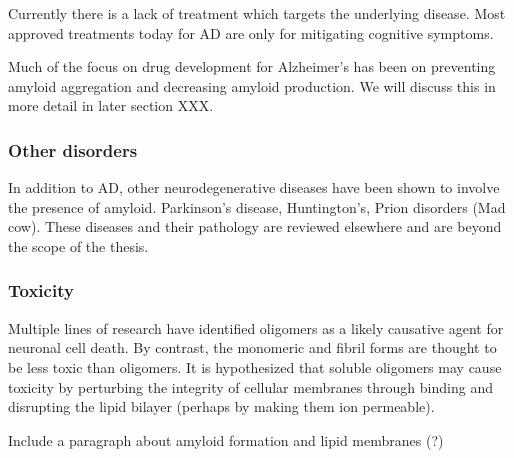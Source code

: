 Currently there is a lack of treatment which targets the underlying disease. Most approved treatments today for AD are only for mitigating cognitive symptoms. 

Much of the focus on drug development for Alzheimer's has been on preventing amyloid aggregation and decreasing amyloid production.
We will discuss this in more detail in later section XXX.

\subsubsection{Other disorders}
In addition to AD, other neurodegenerative diseases have been shown to involve the presence of amyloid.  Parkinson's disease, Huntington's, Prion disorders (Mad cow).  These diseases and their pathology are reviewed elsewhere and are beyond the scope of the thesis.


\subsubsection{Toxicity}
\begin{outline}
	\1 Multiple lines of research have identified oligomers as a likely causative agent for neuronal cell death. By contrast, the monomeric and fibril forms are thought to be less toxic than oligomers. It is hypothesized that soluble oligomers may cause toxicity by perturbing the integrity of cellular membranes through binding and disrupting the lipid bilayer (perhaps by making them ion permeable). \cite{Walsh:2007fu}

	\1 Include a paragraph about amyloid formation and lipid membranes (?)
\end{outline}


